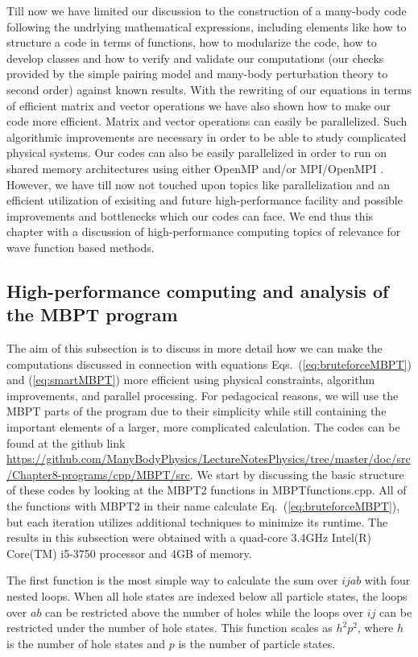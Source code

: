 Till now we have limited our discussion to the construction of a
many-body code following the undrlying mathematical expressions, 
including elements like how to structure a code in
terms of functions, how to modularize the code, how to develop classes
and how to verify and validate our computations (our checks provided
by the simple pairing model and many-body perturbation theory to
second order) against known results.  With the rewriting of our
equations in terms of efficient matrix and vector operations we have
also shown how to make our code more efficient.  Matrix and vector
operations can easily be parallelized. Such algorithmic improvements
are necessary in order to be able to study complicated physical
systems.  Our codes can also be easily parallelized in order to run on
shared memory architectures using either OpenMP \cite{openmp} and/or
MPI/OpenMPI \cite{mpi,openmpi}.  However, we have till now not touched
upon topics like parallelization and an efficient utilization of
exisiting and future high-performance facility and possible
improvements and bottlenecks which our codes can face. We end thus
this chapter with a discussion of high-performance computing topics of
relevance for wave function based methods. 


\subsection{High-performance computing and analysis of the MBPT program}
The aim of this subsection is to discuss in more detail how we can make the computations discussed in connection with equations 
Eqs.~(\ref{eq:bruteforceMBPT}) and (\ref{eq:smartMBPT}) more efficient using physical constraints, algorithm improvements, and parallel processing. For pedagocical reasons, we will use the MBPT parts of the program due to their simplicity while still containing the important elements of a larger, more complicated calculation. 
The codes can be found at the github link 
\url{https://github.com/ManyBodyPhysics/LectureNotesPhysics/tree/master/doc/src/Chapter8-programs/cpp/MBPT/src}.
We start by discussing the basic structure of these codes by looking at the MBPT2 functions in MBPTfunctions.cpp.
All of the functions with MBPT2 in their name calculate Eq.~(\ref{eq:bruteforceMBPT}), but each iteration utilizes additional techniques to minimize its runtime. The results in this subsection were obtained with a quad-core 3.4GHz Intel(R) Core(TM) i5-3750 processor and 4GB of memory.

The first function is the most simple way to calculate the sum over $ijab$ with four nested loops. When all hole states are indexed below all particle states, the loops over $ab$ can be restricted above the number of holes while the loops over $ij$ can be restricted under the number of hole states. This function scales as $h^2p^2$, where $h$ is the number of hole states and $p$ is the number of particle states.

